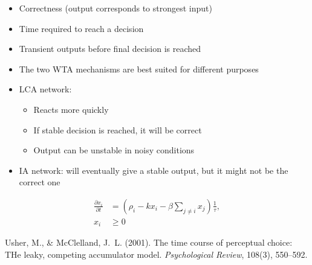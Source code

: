 \documentclass[final]{beamer}
\begin{document}
\begin{frame}[t]
\begin{tcbraster}[raster columns=4, raster column skip=10mm, raster row skip=10mm, raster equal height=rows, raster force size=false]
\begin{tcolorbox}[title=Benchmarks, add to width=-5cm]
\begin{itemize}
                \item Correctness (output corresponds to strongest input)
                \item Time required to reach a decision
                \item Transient outputs before final decision is reached
            \end{itemize}
        \end{tcolorbox}
        \begin{tcolorbox}[title=Conclusions, add to width=-3cm]
            \begin{itemize}
                \item The two WTA mechanisms are best suited for different purposes
                \item LCA network:
                    \begin{itemize}
                        \item Reacts more quickly
                        \item If stable decision is reached, it will be correct
                        \item Output can be unstable in noisy conditions
                    \end{itemize}
                    \item IA network: will eventually give a stable output, but it might not be the correct one
            \end{itemize}
        \end{tcolorbox}
        \begin{tcolorbox}[raster multicolumn=4,title={Leaky, Competing Accumulators (LCA)},halign title=left]
            \begin{minipage}[c][6in]{20cm}
                \vfill
                \vfill
                \begin{align*}
                    \frac{{\partial x}_i}{\partial t} &= \left(\rho_i - kx_i - \beta \sum_{j \neq i} x_j\right) \frac{1}{\tau},\\
                    x_i &\ge 0
                \end{align*}
                \vfill
                {\tiny Usher, M., \& McClelland, J.~L. (2001). The time course of perceptual choice: THe leaky, competing accumulator model. \textit{Psychological Review}, 108(3), 550--592.\par}
            \end{minipage}
            \hfill

\end{tcolorbox}
\end{tcbraster}
\end{frame}
\end{document}
